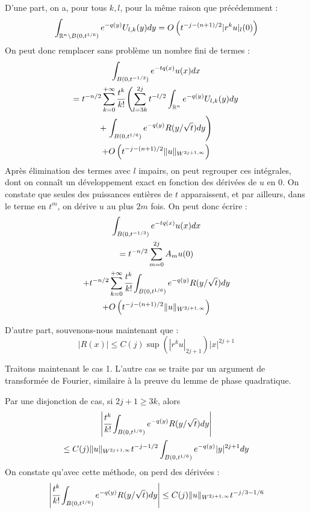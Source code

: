 \begin{preuve}
D'une part, on a, pour tous $k,l$, pour la même raison que précédemment :
\begin{equation*}
  \int_{\mathbb{R}^n \setminus B(0,t^{1/6})}e^{-q(y)}U_{l,k}(y)dy = O\left(t^{-j-(n+1)/2}|r^ku|_{l}(0)\right)
\end{equation*}
\noindent On peut donc remplacer sans problème un nombre fini de termes :
\begin{multline*}
\int_{B(0,t^{-1/3})}e^{-tq(x)}u(x)dx \\= t^{-n/2}\sum_{k=0}^{+\infty}\cfrac {t^k}{k!}\left(\sum_{l=3k}^{2j} t^{-l/2}\int_{\mathbb{R}^n}e^{-q(y)}U_{l,k}(y)dy\right. \\+ \left.\int_{B(0,t^{1/6})}e^{-q(y)}R(y/\sqrt{t})dy\right) \\+ O\left(t^{-j-(n+1)/2}\|u\|_{W^{2j+1,\infty}}\right)
\end{multline*}
\noindent Après élimination des termes avec $l$ impairs, on peut regrouper ces intégrales, dont on connaît un développement exact en fonction des dérivées de $u$ en $0$. On constate que seules des puissances entières de $t$ apparaissent, et par ailleurs, dans le terme en $t^m$, on dérive $u$ au plus $2m$ fois. On peut donc écrire :
\begin{multline*}
\int_{B(0,t^{-1/3})}e^{-tq(x)}u(x)dx \\= t^{-n/2}\sum_{m=0}^{2j}A_mu(0) \\+ t^{-n/2}\sum_{k=0}^{+\infty}\cfrac{t^k}{k!}\int_{B(0,t^{1/6})}e^{-q(y)}R(y/\sqrt{t})dy \\+ O\left(t^{-j-(n+1)/2}\|u\|_{W^{2j+1,\infty}}\right)
\end{multline*}

D'autre part, souvenons-nous maintenant que :
\begin{equation*}
  |R(x)| \leq C(j) \sup (|r^ku|_{2j+1}) |x|^{2j+1}
\end{equation*}

Traitons maintenant le cas 1. L'autre cas se traite par un argument de transformée de Fourier, similaire à la preuve du lemme de phase quadratique. 

Par une disjonction de cas, si $2j+1 \geq 3k$, alors
\begin{multline*}
  \left|\cfrac{t^k}{k!}\int_{B(0,t^{1/6})}e^{-q(y)}R(y/\sqrt{t})dy\right| \\\leq C(j)\|u\|_{W^{2j+1,\infty}}t^{-j-1/2}\int_{B(0,t^{1/6})}e^{-q(y)}|y|^{2j+1}dy
\end{multline*}
\noindent On constate qu'avec cette méthode, on perd des dérivées :
\begin{equation*}
  \left|\cfrac{t^k}{k!}\int_{B(0,t^{1/6})}e^{-q(y)}R(y/\sqrt{t})dy\right| \leq C(j)\|u\|_{W^{2j+1,\infty}}t^{-j/3-1/6}
\end{equation*}


\end{preuve}
